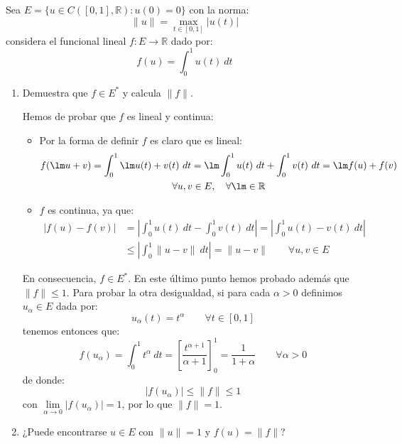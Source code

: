 \begin{ejercicio}
    Sea $E = \{u\in C([0,1],\mathbb{R}) : u(0) = 0\}$ con la norma:
    \begin{equation*}
        \|u\| = \max_{t\in [0,1]}|u(t)|
    \end{equation*}
    considera el funcional lineal $f:E\to \mathbb{R}$ dado por:
    \begin{equation*}
        f(u) = \int_{0}^{1} u(t)~dt 
    \end{equation*}
    \begin{enumerate}[label=\alph*)]
        \item Demuestra que $f\in E^\ast$ y calcula $\|f\|$.

            Hemos de probar que $f$ es lineal y continua:
            \begin{itemize}
                \item Por la forma de definir $f$ es claro que es lineal:
                    \begin{multline*}
                        f(\lm u + v) = \int_{0}^{1} \lm u(t) + v(t)~dt  = \lm \int_{0}^{1} u(t)~dt  + \int_{0}^{1} v(t)~dt  = \lm f(u) + f(v) \\ \forall u,v\in E, \quad  \forall \lm \in \mathbb{R}
                    \end{multline*}
                \item $f$ es continua, ya que:
                    \begin{align*}
                        |f(u)-f(v)| &= \left|\int_{0}^{1} u(t)~dt -\int_{0}^{1} v(t)~dt \right| = \left|\int_{0}^{1} u(t)-v(t)~dt \right| \\ 
                                                                                               &\leq \left|\int_{0}^{1} \|u-v\|~dt \right| = \|u-v\| \qquad \forall u,v\in E
                    \end{align*}
            \end{itemize}
            En consecuencia, $f\in E^\ast$. En este último punto hemos probado además que $\|f\|\leq 1$. Para probar la otra desigualdad, si para cada $\alpha>0$ definimos $u_\alpha \in E$ dada por:
            \begin{equation*}
                u_\alpha(t) = t^{\alpha} \qquad \forall t\in [0,1]
            \end{equation*}
            tenemos entonces que:
            \begin{equation*}
                f(u_\alpha) = \int_{0}^{1} t^{\alpha}~dt  = \left[\dfrac{t^{\alpha+1}}{\alpha+1}\right]^1_0 = \dfrac{1}{1+\alpha} \qquad \forall \alpha>0
            \end{equation*}
            de donde:
            \begin{equation*}
                |f(u_\alpha)|  \leq \|f\| \leq 1
            \end{equation*}
            con $\lim\limits_{\alpha\to0} |f(u_\alpha)| = 1$, por lo que $\|f\| = 1$.
        \item ¿Puede encontrarse $u\in E$ con $\|u\| = 1$ y $f(u) = \|f\|$?


\end{enumerate}
\end{ejercicio}
